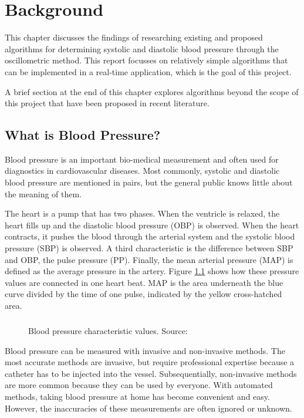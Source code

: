 \chapter{Background}\label{cp:theory} %
This chapter discusses the findings of researching existing and proposed algorithms for determining systolic and diastolic blood pressure through the oscillometric method. This report focusses on relatively simple algorithms that can be implemented in a real-time application, which is the goal of this project.

A brief section at the end of this chapter explores algorithms beyond the scope of this project that have been proposed in recent literature.

\section{What is Blood Pressure?}
Blood pressure is an important bio-medical measurement and often used for  diagnostics in cardiovascular diseases. Most commonly, systolic and diastolic blood pressure are mentioned in pairs, but the general public knows little about the meaning of them.

The heart is a pump that has two phases. When the ventricle is relaxed, the heart fills up and the diastolic blood pressure (OBP) is observed. When the heart contracts, it pushes the blood through the arterial system and the systolic blood pressure (SBP) is observed. A third characteristic is the difference between SBP and OBP, the pulse pressure (PP). Finally, the mean arterial pressure (MAP) is defined as the average pressure in the artery. Figure \ref{fig:BP} shows how these pressure values are connected in one heart beat. MAP is the area underneath the blue curve divided by the time of one pulse, indicated by the yellow cross-hatched area. \cite{Boron2012}\paragraph{}

\begin{figure}[]
\centering
\caption{Blood pressure characteristic values. Source: \cite{Boron2012}}
\label{fig:BP}
\end{figure}


Blood pressure can be measured with invasive and non-invasive methods. The most accurate methods are invasive, but require professional expertise because a catheter has to be injected into the vessel. Subsequentially, non-invasive methods are more common because they can be used by everyone. With automated methods, taking blood pressure at home has become convenient and easy. However, the inaccuracies of these measurements are often ignored or unknown.

